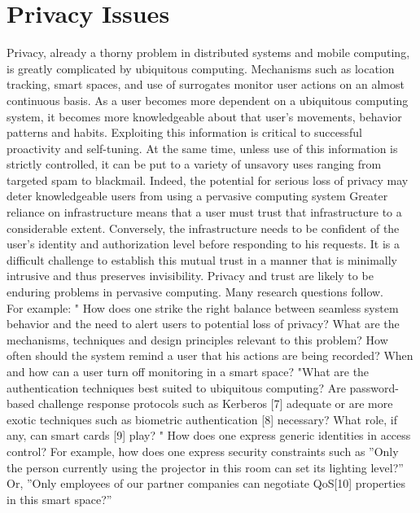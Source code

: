 \documentclass[12pt]{report}
\begin{document}
\chapter{Privacy Issues}
\hspace*{0.5in}Privacy, already a thorny problem in distributed systems and mobile computing, is greatly complicated by ubiquitous computing. Mechanisms such as location tracking, smart spaces, and use of surrogates monitor user actions on an almost continuous basis. As a user becomes more dependent on a ubiquitous computing system, it becomes more knowledgeable about that user's movements, behavior patterns and habits. Exploiting this information is critical to successful proactivity and self-tuning. At the same time, unless use of this information is strictly controlled, it can be put to a variety of unsavory uses ranging from targeted spam to blackmail. Indeed, the potential for serious loss of privacy may deter knowledgeable users from using a pervasive computing system Greater reliance on infrastructure means that a user must trust that infrastructure to a considerable extent. Conversely, the infrastructure needs to be confident of the user's identity and authorization level before responding to his requests. It is a difficult challenge to establish this mutual trust in a manner that is minimally intrusive and thus preserves invisibility. Privacy and trust are likely to be enduring problems in pervasive computing. Many research questions follow. \\\hspace*{0.5in}For example: " How does one strike the right balance between seamless system behavior and the need to alert users to potential loss of privacy? What are the mechanisms, techniques and design principles relevant to this problem? How often should the system remind a user that his actions are being recorded? When and how can a user turn off monitoring in a smart space? "What are the authentication techniques best suited to ubiquitous computing? Are password-based challenge response protocols such as Kerberos [7] adequate or are more exotic techniques such as biometric authentication [8] necessary? What role, if any, can smart cards [9] play? " How does one express generic identities in access control? For example, how does one express security constraints such as ''Only the person currently using the projector in this room can set its lighting level?'' Or, ''Only employees of our partner companies can negotiate QoS[10] properties in this smart space?''
\end{document}
